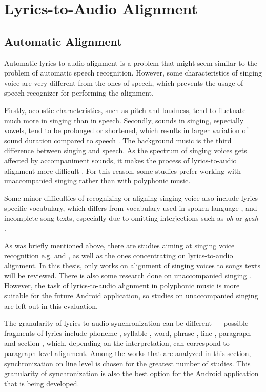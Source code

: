 \chapter{Lyrics-to-Audio Alignment}
\label{sec:alignment}

\section{Automatic Alignment}

Automatic lyrics-to-audio alignment is a problem that might seem similar to the problem of automatic speech recognition. However, some characteristics of singing voice are very different from the ones of speech, which prevents the usage of speech recognizer for performing the alignment.

Firstly, acoustic characteristics, such as pitch and loudness, tend to fluctuate much more in singing than in speech. Secondly, sounds in singing, especially vowels, tend to be prolonged or shortened, which results in larger variation of sound duration compared to speech \citep{Kruspe.2018}. The background music is the third difference between singing and speech. As the spectrum of singing voices gets affected by accompaniment sounds, it makes the process of lyrics-to-audio alignment more difficult \citep{Fujihara.2012}. For this reason, some studies prefer working with unaccompanied singing rather than with polyphonic music.

Some minor difficulties of recognizing or aligning singing voice also include lyrics-specific vocabulary, which differs from vocabulary used in spoken language \citep{Kruspe.2018}, and incomplete song texts, especially due to omitting interjections such as \textit{oh} or \textit{yeah} \citep{Fujihara.2012}.

As was briefly mentioned above, there are studies aiming at singing voice recognition e.g. \cite{Kruspe.2018} and \cite{Sasou.2005}, as well as the ones concentrating on lyrics-to-audio alignment. In this thesis, only works on alignment of singing voices to songs texts will be reviewed. There is also some research done on unaccompanied singing \citep{Loscos.1999, Sasou.2005, Gong.2015}. However, the task of lyrics-to-audio alignment in polyphonic music is more suitable for the future Android application, so studies on unaccompanied singing are left out in this evaluation.

The granularity of lyrics-to-audio synchronization can be different --- possible fragments of lyrics include phoneme \citep{Mauch.2012}, syllable \citep{Iskandar.2006}, word, phrase \citep{Fujihara.2006, Dzhambazov.2016}, line \citep{Wang.2008, Wong.2007, Mesaros.2008}, paragraph \citep{Lee.2008} and section \citep{Wang.2008}, which, depending on the interpretation, can correspond to paragraph-level alignment. Among the works that are analyzed in this section, synchronization on line level is chosen for the greatest number of studies. This granularity of synchronization is also the best option for the Android application that is being developed.

